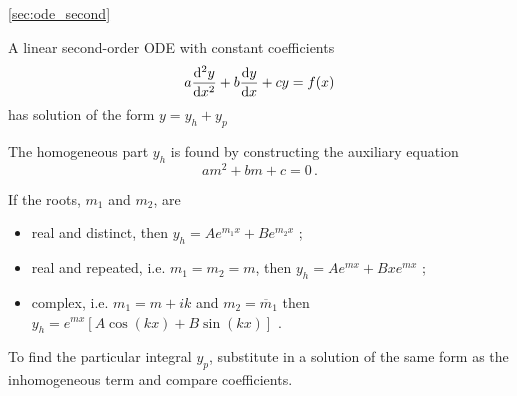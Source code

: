 
\begin{recap}{\ref{sec:ode_second}}

\item A linear second-order ODE with constant coefficients
\[
a\frac{{\rm d} ^2y}{{\rm d} x^2}+b\frac{{\rm d} y}{{\rm d} x}+cy=f(x)
\]
has solution of the form $y={y}_{h}+{y}_{p}$

\item The homogeneous part ${y}_{h}$ is found by constructing the auxiliary equation
\[
a{m}^{2}+bm+c=0 \, .
\]

\item If the roots, ${m}_{1}$ and ${m}_{2}$, are

\begin{itemize}
\item real and distinct, then ${y}_{h}=A{e}^{{m}_{1}x}+B{e}^{{m}_{2}x}$ ;

\item real and repeated, i.e. ${m}_{1}={m}_{2}=m$, then ${y}_{h}=A{e}^{mx}+B{xe}^{mx}$ ;

\item complex, i.e. ${m}_{1}=m+ik$ and ${m}_{2}={\overline{m}}_{1} $ then ${y}_{h}={e}^{mx}\left[A\cos \left(kx\right)+B\sin \left(kx\right)\right]$ .

\end{itemize}

\item To find the particular integral ${y}_{p}$, substitute in a solution of the same form as the inhomogeneous term and compare coefficients.

\end{recap}
